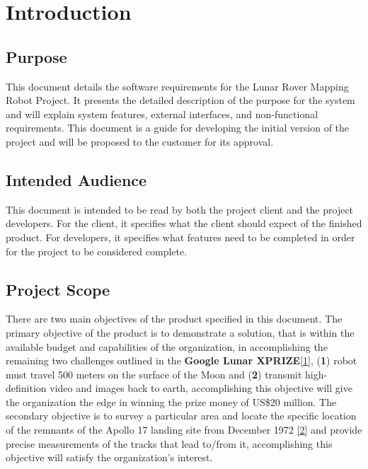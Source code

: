 \documentclass[12pt,a4paper]{article}
\begin{document}
    \vspace{50px}
    \listoffigures
	
	\newpage
	
	
	\section{Introduction}
	\subsection{Purpose}
This document details the software requirements for the Lunar Rover Mapping Robot Project. It presents the detailed description of the purpose for the system and will explain system features, external interfaces, and non-functional requirements. This document is a guide for developing the initial version of the project and will be proposed to the customer for its approval.

	\subsection{Intended Audience}
   	This document is intended to be read by both the project client and the project developers. For the client, it specifies what the client should expect of the finished product. For developers, it specifies what features need to be completed in order for the project to be considered complete.

	\subsection{Project Scope}
	There are two main objectives of the product specified in this document. The primary objective of the product is to demonstrate a solution, that is within the available budget and capabilities of the organization, in accomplishing the remaining two challenges outlined in the \textbf{Google Lunar XPRIZE}\hyperlink{googlelunarxprize} {[1]}, (\textbf{1}) robot must travel 500 meters on the surface of the Moon and (\textbf{2}) transmit high-definition video and images back to earth, accomplishing this objective will give the organization the edge in winning the prize money of US\$20 million. The secondary objective is to survey a particular area and locate the specific location of the remnants of the Apollo 17 landing site from December 1972 \hyperlink{apollo17} {[2]} and provide precise measurements of the tracks that lead to/from it, accomplishing this objective will satisfy the organization's interest.
    
\end{document}
